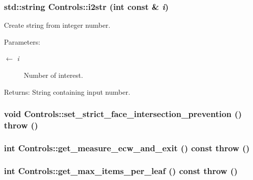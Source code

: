 \subsubsection{\setlength{\rightskip}{0pt plus 5cm}std::string Controls::i2str (int const \& {\em i})}\label{classControls_3f4e84a77846aac3fa388db6c0ae2b60}


Create string from integer number. \begin{Desc}
\item[Parameters:]
\begin{description}
\item[\mbox{$\leftarrow$} {\em i}]Number of interest. \end{description}
\end{Desc}
\begin{Desc}
\item[Returns:]String containing input number. \end{Desc}
\subsubsection{\setlength{\rightskip}{0pt plus 5cm}void Controls::set\_\-strict\_\-face\_\-intersection\_\-prevention ()  throw ()\hspace{0.3cm}{\tt  [inline]}}\label{classControls_2cc048d73fe3a581940f2d2571863474}


\subsubsection{\setlength{\rightskip}{0pt plus 5cm}int Controls::get\_\-measure\_\-ecw\_\-and\_\-exit () const  throw ()\hspace{0.3cm}{\tt  [inline]}}\label{classControls_3a394fe6d0f7355786d4a44efc432fbd}


\subsubsection{\setlength{\rightskip}{0pt plus 5cm}int Controls::get\_\-max\_\-items\_\-per\_\-leaf () const  throw ()\hspace{0.3cm}{\tt  [inline]}}\label{classControls_0b41c2b51f1bf743d3b351f2d5b28395}


